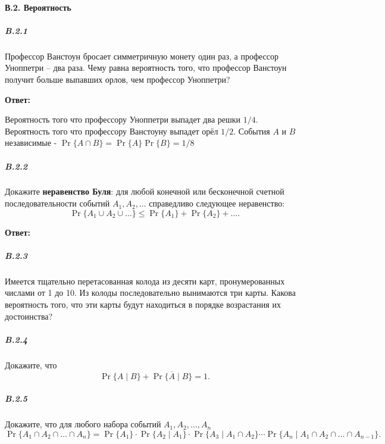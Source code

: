 \paragraph{В.2. Вероятность}

\subparagraph{B.2.1}
Профессор Ванстоун бросает симметричную монету один раз, а профессор Уноппетри -- два раза. 
Чему равна вероятность того, что профессор Ванстоун получит больше выпавших орлов,
чем профессор Уноппетри?

\textbf{Ответ:}

Вероятность того что профессору Уноппетри выпадет два решки $1/4$.
Вероятность того что профессору Ванстоуну выпадет орёл $1/2$.
События $A$ и $B$ независимые - $\Pr \{ A \cap B \} = \Pr \{ A \} \Pr\{B \} = 1/8$


\subparagraph{B.2.2}
Докажите \textbf{неравенство Буля}: для любой конечной или бесконечной счетной 
последовательности событий \( A_1, A_2, \dots \) справедливо следующее неравенство:
\[
\Pr \{ A_1 \cup A_2 \cup \dots \} \leq \Pr \{ A_1 \} + \Pr \{ A_2 \} + \dots .
\]

\textbf{Ответ:}

\subparagraph{B.2.3}
Имеется тщательно перетасованная колода из десяти карт, пронумерованных числами от 1 до 10. 
Из колоды последовательно вынимаются три карты. 
Какова вероятность того, что эти карты будут находиться в порядке возрастания их достоинства?

\subparagraph{B.2.4}
Докажите, что
\[
\Pr \{ A \mid B \} + \Pr \{ \overline{A} \mid B \} = 1.
\]

\subparagraph{B.2.5}
Докажите, что для любого набора событий \( A_1, A_2, \dots, A_n \)
\[
\Pr \{ A_1 \cap A_2 \cap \dots \cap A_n \} = \Pr \{ A_1 \} 
\cdot \Pr \{ A_2 \mid A_1 \} \cdot \Pr \{ A_3 \mid A_1 \cap A_2 \} \cdots 
\Pr \{ A_n \mid A_1 \cap A_2 \cap \dots \cap A_{n-1} \}.
\]